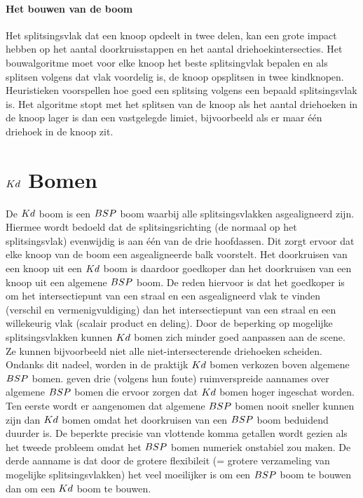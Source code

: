     \paragraph{Het bouwen van de boom}
    Het splitsingsvlak dat een knoop opdeelt in twee delen, kan een grote impact hebben op het aantal doorkruisstappen en het aantal driehoekintersecties.
    Het bouwalgoritme moet voor elke knoop het beste splitsingvlak bepalen en als splitsen volgens dat vlak voordelig is, de knoop opsplitsen in twee kindknopen.
    Heuristieken voorspellen hoe goed een splitsing volgens een bepaald splitsingsvlak is.   
    Het algoritme stopt met het splitsen van de knoop als het aantal driehoeken in de knoop lager is dan een vastgelegde limiet, bijvoorbeeld als er maar één driehoek in de knoop zit.

   
\section{$Kd$ Bomen}   
    De $Kd$ boom is een $BSP$ boom waarbij alle splitsingsvlakken asgealigneerd zijn.
    Hiermee wordt bedoeld dat de splitsingsrichting (de normaal op het splitsingsvlak) evenwijdig is aan één van de drie hoofdassen.
    Dit zorgt ervoor dat elke knoop van de boom een asgealigneerde balk voorstelt.
    Het doorkruisen van een knoop uit een $Kd$ boom is daardoor goedkoper dan het doorkruisen van een knoop uit een algemene $BSP$ boom.
    De reden hiervoor is dat het goedkoper is om het intersectiepunt van een straal en een asgealigneerd vlak te vinden (verschil en vermenigvuldiging) dan het intersectiepunt van een straal en een willekeurig vlak (scalair product en deling).
    Door de beperking op mogelijke splitsingsvlakken kunnen $Kd$ bomen zich minder goed aanpassen aan de scene.
    Ze kunnen bijvoorbeeld niet alle niet-intersecterende driehoeken scheiden. 
    \\ %

    Ondanks dit nadeel, worden in de praktijk $Kd$ bomen verkozen boven algemene $BSP$ bomen.
    \authorIze{} \cite{ize} geven drie (volgens hun foute) ruimverspreide aannames over algemene $BSP$ bomen die ervoor zorgen dat $Kd$ bomen hoger ingeschat worden.
    Ten eerste wordt er aangenomen dat algemene $BSP$ bomen nooit sneller kunnen zijn dan $Kd$ bomen omdat het doorkruisen van een $BSP$ boom beduidend duurder is.
    De beperkte precisie van vlottende komma getallen wordt gezien als het tweede probleem omdat het $BSP$ bomen numeriek onstabiel zou maken.
    De derde aanname is dat door de grotere flexibileit (= grotere verzameling van mogelijke splitsingsvlakken) het veel moeilijker is om een $BSP$ boom te bouwen dan om een $Kd$ boom te bouwen.
    \\

